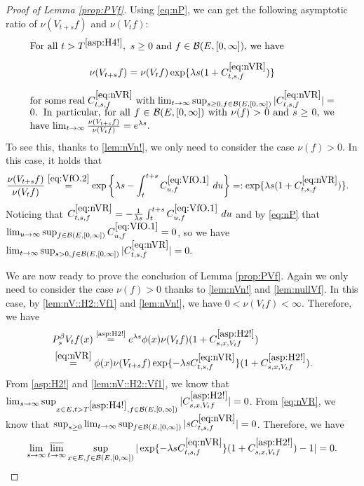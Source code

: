 \documentclass[12pt,a4paper]{amsart}
\numberwithin{equation}{section}
\theoremstyle{plain}
\theoremstyle{definition}
\theoremstyle{remark}
\begin{document}
\begin{proof}[Proof of Lemma \ref{prop:PVf}]
	Using \eqref{eq:nP}, we can get the following asymptotic ratio of $\nu(V_{t+s}f)$ and $\nu(V_tf)$:
\begin{equation} \label{eq:nVR}
\begin{minipage}{0.9\textwidth}
	For all $t> T^{\eqref{asp:H4!}},~s \geq 0$ and $f\in \mathcal B(E,[0,\infty])$, we have \[\nu(V_{t+s}f) = \nu(V_tf) \exp\{\lambda s (1+C^{\eqref{eq:nVR}}_{t,s,f}) \}\] for some real $C^{\eqref{eq:nVR}}_{t,s,f}$ with
	 $\lim_{t\to \infty} \sup_{s\geq  0,f\in \mathcal B(E,[0,\infty])} |C^{\eqref{eq:nVR}}_{t,s,f}| = 0$.
	In particular, for all $f\in \mathcal B(E,[0,\infty])$ with $\nu(f)>0$ and $s\geq 0$, we have $\lim_{t\to \infty} \frac{\nu(V_{t+s}f)}{\nu(V_tf)} = e^{\lambda s}$.
\end{minipage}
\end{equation}
	To see this, thanks to \eqref{lem:nVn!},
	we only need to consider the case $\nu(f)>0$. In this case,  it holds  that
\begin{align}
	&\frac{\nu(V_{t+s} f)} {\nu(V_t f)}
	\overset{\eqref{eq:VfO.2}}= \exp\left\{\lambda s- \int_t^{t+s} C^{\eqref{eq:VfO.1}}_{u,f} ~du\right\}
	=: \exp\{\lambda s (1+C^{\eqref{eq:nVR}}_{t,s,f}) \}.
\end{align}
	Noticing that $C^{\eqref{eq:nVR}}_{t,s,f} = -\frac{1}{\lambda s}\int_t^{t+s} C^{\eqref{eq:VfO.1}}_{u,f} ~du$ and by \eqref{eq:nP} that $\lim_{u\to \infty}\sup_{f\in \mathcal B(E,[0,\infty])} C^{\eqref{eq:VfO.1}}_{u,f} = 0$,
	so we have
	$\lim_{t\to \infty} \sup_{s> 0,f\in \mathcal B(E,[0,\infty])} |C^{\eqref{eq:nVR}}_{t,s,f}| = 0. $
	
	We are now  ready to prove the conclusion of Lemma \ref{prop:PVf}.
	Again we only need to consider the case $\nu(f)>0$ thanks to \eqref{lem:nVn!} and  \eqref{lem:nullVf}.
	In this case, by \eqref{lem:nV::H2::Vf1} and \eqref{lem:nVn!}, we have $0<\nu(V_{t}f)<\infty$.
	Therefore, we have
\begin{align}
	& P_s^\beta V_t f(x)
	\overset{\text{\eqref{asp:H2!}}}= e^{\lambda s} \phi(x) \nu(V_tf) (1+C^{\eqref{asp:H2!}}_{s,x,V_tf})
	\\&\overset{\eqref{eq:nVR}}= \phi(x) \nu(V_{t+s}f) \exp\{-\lambda s C^{\eqref{eq:nVR}}_{t,s,f}\} (1+C^{\eqref{asp:H2!}}_{s,x,V_tf}).
\end{align}
	From \eqref{asp:H2!} and \eqref{lem:nV::H2::Vf1}, we know that $\lim_{s\to \infty} \sup_{x\in E, t> T^{\eqref{asp:H4!}}, f\in \mathcal B(E,[0,\infty])}
	|C^{\eqref{asp:H2!}}_{s,x,V_tf}| = 0$.
	From \eqref{eq:nVR}, we know that $\sup_{s\geq 0} \lim_{t\to \infty} \sup_{f\in \mathcal B(E,[0,\infty])}
	|sC^{\eqref{eq:nVR}}_{t,s,f}| = 0$.
	Therefore, we have
\[
	\lim_{s\to \infty}\varlimsup_{t\to \infty}\sup_{x\in E, f\in \mathcal B(E,[0,\infty])}
	|\exp\{-\lambda s C^{\eqref{eq:nVR}}_{t,s,f}\} (1+C^{\eqref{asp:H2!}}_{s,x,V_tf})-1| = 0. \qedhere
\]
\end{proof}
\end{document}
